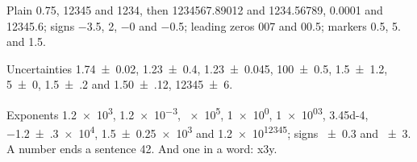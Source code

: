 \documentclass{article}
\begin{document}
Plain \num{0.75}, \num{12345} and \num{1234}, then \num{1234567.89012} and \num{1234.56789},
\num{0.0001} and \num{12345.6}; signs \num{-3.5}, \num{+2}, \num{-0} and \num{-0.5};
leading zeros \num{007} and \num{00.5}; markers \num{.5}, \num{5.} and \num{1,5}.

Uncertainties \num{1.74 \pm 0.02}, \num{1.23 \pm 0.4}, \num{1.23 +- 0.045}, \num{100 \pm 0.5},
\num{1.5 \pm 1.2}, \num{5 \pm 0}, \num{1.5(2)} and \num{1.50(12)}, \num{12345(6)}.

Exponents \num{1.2e3}, \num{1.2e-3}, \num{e5}, \num{1e0}, \num{1e03}, \num{3.45d-4},
\num{-1.2(3)e4}, \num{1.5 \pm 0.25e3} and \num{1.2e12345}; signs \num{\pm 0.3} and \num{+-3}.
A number ends a sentence \num{42}. And one in a word: x\num{3}y.
\end{document}
